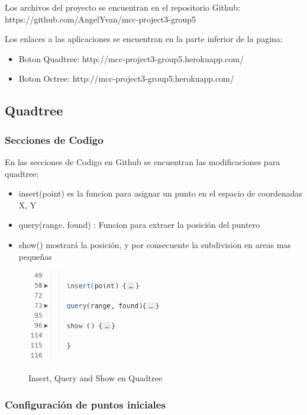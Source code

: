 \documentclass{article}
\begin{document}
Los archivos del proyecto se encuentran en el repositorio Github: https://github.com/AngelYvan/mcc-project3-group5

Los enlaces a las aplicaciones se encuentran en la parte inferior de la pagina:

\begin{itemize}
    \item Boton Quadtree: http://mcc-project3-group5.herokuapp.com/  
    \item Boton Octree: http://mcc-project3-group5.herokuapp.com/ 
\end{itemize}


\subsection{Quadtree}
\subsubsection{Secciones de Codigo}

En las secciones de Codigo en Github se encuentran las modificaciones para quadtree:

\begin{itemize}
    \item insert(point) es la funcion para asignar un punto en el espacio de coordenadas X, Y
    \item query(range, found) : Funcion  para extraer la posición del puntero
    \item show() mostrará la posición, y por consecuente la subdivision en areas mas pequeñas
\end{itemize}


\begin{figure}[H]
\centering
\includegraphics[width=0.8\textwidth]{img/quad_insertque.png}
\caption{Insert, Query and Show en Quadtree}
\end{figure}

\subsubsection{Configuración de puntos iniciales}
\end{document}
